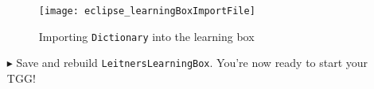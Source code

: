 \begin{itemize}
\vspace{1cm}

\begin{figure}[htbp]
\begin{center}
  \texttt{[image: eclipse\_learningBoxImportFile]}
  \caption{Importing \texttt{Dictionary} into the learning box}
  \label{eclipse:importConfigFile}
\end{center}
\end{figure}

\vspace{1cm}

\item[$\blacktriangleright$] Save and rebuild \texttt{LeitnersLearningBox}. You're now ready to start your TGG!

\end{itemize}
